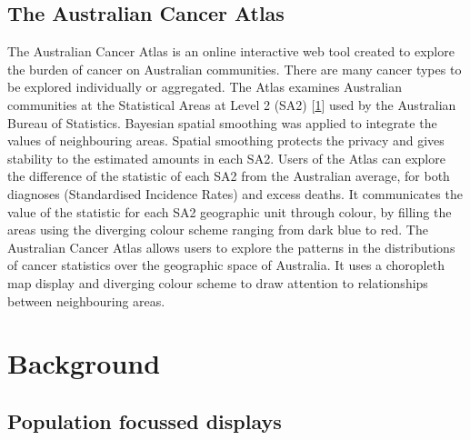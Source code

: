 \documentclass[conference,final,]{IEEEtran}
\begin{document}
\hypertarget{the-australian-cancer-atlas}{%
\subsection{The Australian Cancer Atlas}\label{the-australian-cancer-atlas}}

The Australian Cancer Atlas is an online interactive web tool created to explore the burden of cancer on Australian communities. There are many cancer types to be explored individually or aggregated.
The Atlas examines Australian communities at the Statistical Areas at Level 2 (SA2) {[}\protect\hyperlink{ref-abs2016}{1}{]} used by the Australian Bureau of Statistics. Bayesian spatial smoothing was applied to integrate the values of neighbouring areas. Spatial smoothing protects the privacy and gives stability to the estimated amounts in each SA2. Users of the Atlas can explore the difference of the statistic of each SA2 from the Australian average, for both diagnoses (Standardised Incidence Rates) and excess deaths. It communicates the value of the statistic for each SA2 geographic unit through colour, by filling the areas using the diverging colour scheme ranging from dark blue to red.
The Australian Cancer Atlas allows users to explore the patterns in the distributions of cancer statistics over the geographic space of Australia. It uses a choropleth map display and diverging colour scheme to draw attention to relationships between neighbouring areas.

\hypertarget{background}{%
\section{Background}\label{background}}

\hypertarget{population-focussed-displays}{%
\subsection{Population focussed displays}\label{population-focussed-displays}}
\end{document}
